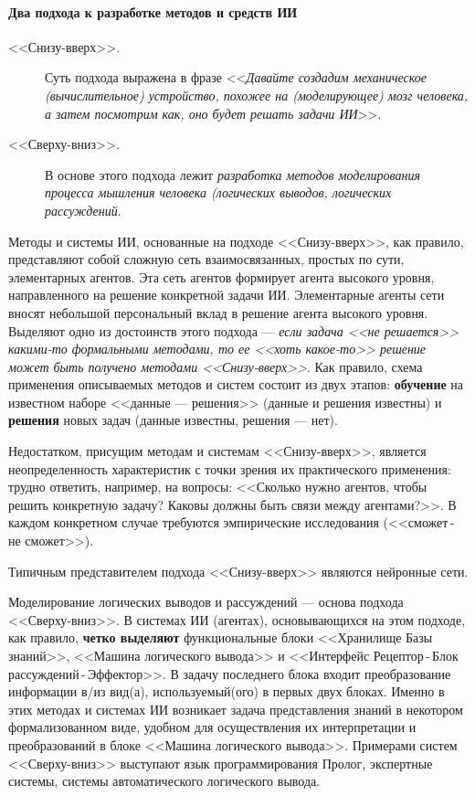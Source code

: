 \documentclass[12pt, openany, twoside]{book} %
\def\rem#1{}
\newenvironment{mygroup}{}{}
\begin{document}
\paragraph{Два подхода к разработке методов и средств ИИ}
\begin{mygroup}
\small\sf
\begin{description}
\item[<<Снизу-вверх>>.] Суть подхода выражена в фразе <<{\em Давайте создадим механическое (вычислительное) устройство, похожее на (моделирующее) мозг человека, а затем посмотрим как, оно будет решать задачи ИИ}>>.
\item[<<Сверху-вниз>>.] В основе этого подхода лежит {\em разработка методов моделирования процесса мышления человека (логических выводов, логических рассуждений}.
\end{description}

Методы и системы ИИ, основанные на подходе <<Снизу-вверх>>, как правило, представляют собой сложную сеть взаимосвязанных, простых по сути, элементарных агентов. Эта сеть агентов формирует агента высокого уровня, направленного на решение конкретной задачи ИИ. Элементарные агенты сети вносят небольшой персональный вклад в решение агента высокого уровня. Выделяют одно из достоинств этого подхода --- {\em если задача <<не решается>> какими-то формальными методами, то ее <<хоть какое-то>> решение может быть получено методами <<Снизу-вверх>>}. Как правило, схема применения описываемых методов и систем состоит из двух этапов: {\bf обучение} на известном наборе <<данные --- решения>> (данные и решения известны) и {\bf решения} новых задач (данные известны, решения --- нет).

Недостатком, присущим методам и системам <<Снизу-вверх>>, является неопределенность характеристик с точки зрения их практического применения: трудно ответить, например, на вопросы: <<Сколько нужно агентов, чтобы решить конкретную задачу? Каковы должны быть связи между агентами?>>. В каждом конкретном случае требуются эмпирические исследования (<<сможет\,{}-\,{}не сможет>>).

Типичным представителем подхода <<Снизу-вверх>> являются нейронные сети.

Моделирование логических выводов и рассуждений --- основа подхода <<Сверху-вниз>>. В системах ИИ (агентах), основывающихся на этом подходе, как правило, {\bf четко выделяют} функциональные блоки <<Хранилище Базы знаний>>, <<Машина логического вывода>> и <<Интерфейс Ре\-цеп\-тор\,{}-\,{}Блок рас\-суж\-де\-ний\,{}-\,{}Эффек\-тор>>. В задачу последнего блока входит преобразование информации в/из вид(а), используемый(ого) в первых двух блоках. Именно в этих методах и системах ИИ возникает задача представления знаний в некотором формализованном виде, удобном для осуществления их интерпретации и преобразований в блоке <<Машина логического вывода>>. Примерами\rem{\footnote{Мы не будем анализировать здесь достоинства и недостатки этих методов, т.~к. все это будет изложено в пособии.}} систем <<Сверху-вниз>> выступают язык программирования Пролог, экспертные системы, системы автоматического логического вывода.

\end{mygroup}
\end{document}
